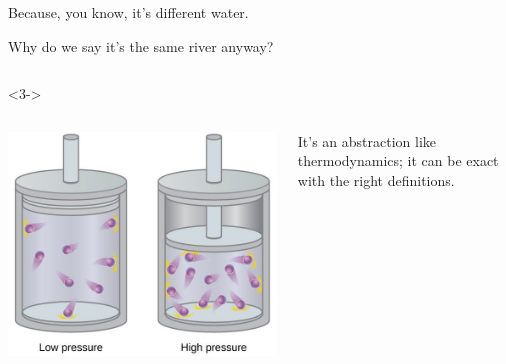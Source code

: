 \documentclass[aspectratio=169]{beamer}
\begin{document}
\begin{frame}{}
\huge
\vspace{0.5 cm}
\begin{center}
Because, you know, it's different water.
\end{center}
\end{frame}

\begin{frame}{Why do we say it's the same river anyway?}
\LARGE
\vspace{0.5 cm}
\begin{columns}

\Large
\vspace{0.25 cm}
\end{columns}

\vspace{0.5 cm}
\begin{uncoverenv}<3->
\begin{columns}
\includegraphics[width=\linewidth]{idealgas.jpg}

\Large
It's an abstraction like thermodynamics; it can be exact with the right definitions.
\end{columns}
\end{uncoverenv}
\end{frame}
\end{document}
